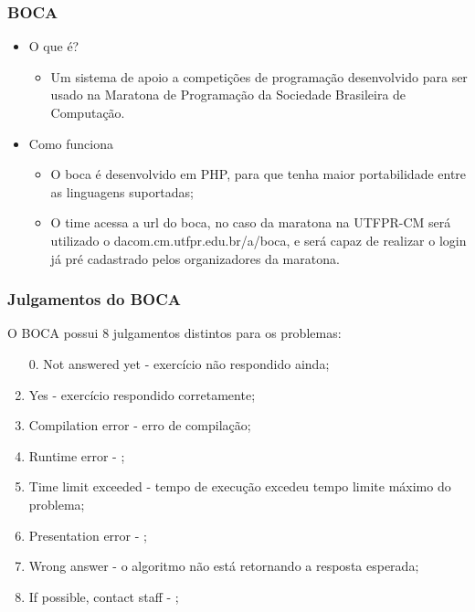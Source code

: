 \begin{frame}
  \frametitle{BOCA}
  \label{tool:boca}
  
  \begin{itemize}
    \item O que é?
    \begin{itemize}
      \item Um sistema de apoio a competições de programação desenvolvido para ser usado na Maratona de Programação da Sociedade Brasileira de Computação.
    \end{itemize}
    \item Como funciona
    \begin{itemize}
      \item O boca é desenvolvido em PHP, para que tenha maior portabilidade entre as linguagens suportadas;
      \item O time acessa a url do boca, no caso da maratona na UTFPR-CM será utilizado o dacom.cm.utfpr.edu.br/a/boca, e será capaz de realizar o login já pré cadastrado pelos organizadores da maratona.
    \end{itemize}
  \end{itemize}
\end{frame}


\begin{frame}
 \frametitle{Julgamentos do BOCA}
O BOCA possui 8 julgamentos distintos para os problemas:
 \begin{enumerate}
  \item[0.] Not answered yet - exercício não respondido ainda;
  \item Yes - exercício respondido corretamente;
  \item Compilation error - erro de compilação;
  \item Runtime error - ;
  \item Time limit exceeded - tempo de execução excedeu tempo limite máximo do problema;
  \item Presentation error - ;
  \item Wrong answer - o algoritmo não está retornando a resposta esperada;
  \item If possible, contact staff - ;
 \end{enumerate}
\end{frame}
